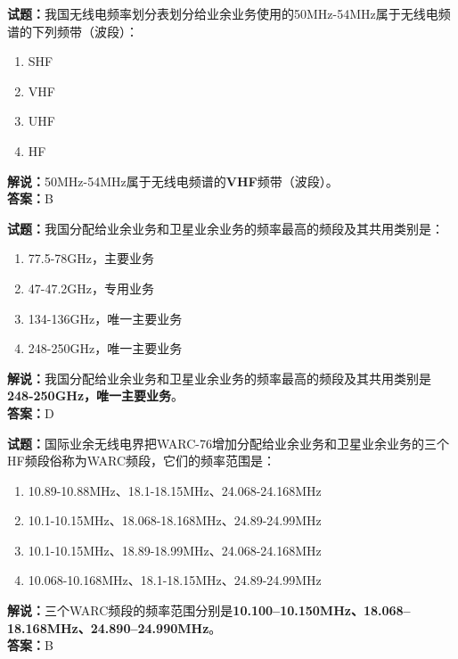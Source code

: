 \documentclass{ctexbook}
\begin{document}
\vspace{\baselineskip}

\noindent\textbf{试题：}我国无线电频率划分表划分给业余业务使用的50\unit{\MHz}-54\unit{\MHz}属于无线电频谱的下列频带（波段）：
\begin{enumerate}[leftmargin=3em]
  \item SHF
  \item VHF
  \item UHF
  \item HF
\end{enumerate}
\noindent\textbf{解说：}50\unit{\MHz}-54\unit{\MHz}属于无线电频谱的\textbf{VHF}频带（波段）。\\\noindent\textbf{答案：}B

\vspace{\baselineskip}

\noindent\textbf{试题：}我国分配给业余业务和卫星业余业务的频率最高的频段及其共用类别是：
\begin{enumerate}[leftmargin=3em]
  \item 77.5-78\unit{\GHz}，主要业务
  \item 47-47.2\unit{\GHz}，专用业务
  \item 134-136\unit{\GHz}，唯一主要业务
  \item 248-250\unit{\GHz}，唯一主要业务
\end{enumerate}
\noindent\textbf{解说：}我国分配给业余业务和卫星业余业务的频率最高的频段及其共用类别是\textbf{248-250\unit{\GHz}，唯一主要业务}。\\\noindent\textbf{答案：}D

\vspace{\baselineskip}

\noindent\textbf{试题：}国际业余无线电界把WARC-76增加分配给业余业务和卫星业余业务的三个HF频段俗称为WARC频段，它们的频率范围是：
\begin{enumerate}[leftmargin=3em]
  \item 10.89-10.88\unit{\MHz}、18.1-18.15\unit{\MHz}、24.068-24.168\unit{\MHz}
  \item 10.1-10.15\unit{\MHz}、18.068-18.168\unit{\MHz}、24.89-24.99\unit{\MHz}
  \item 10.1-10.15\unit{\MHz}、18.89-18.99\unit{\MHz}、24.068-24.168\unit{\MHz}
  \item 10.068-10.168\unit{\MHz}、18.1-18.15\unit{\MHz}、24.89-24.99\unit{\MHz}
\end{enumerate}
\noindent\textbf{解说：}三个WARC频段的频率范围分别是\textbf{10.100–10.150\unit{\MHz}、18.068–18.168\unit{\MHz}、24.890–24.990\unit{\MHz}}。\\\noindent\textbf{答案：}B
\end{document}
